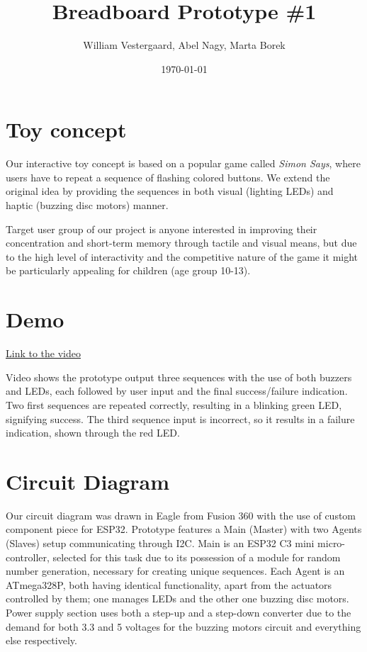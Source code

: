 \documentclass[a4paper]{article}
\title{Breadboard Prototype \#1}
\author{William Vestergaard, Abel Nagy, Marta Borek}
\date{\today}
\begin{document}
\maketitle	
\section{Toy concept}

\noindent Our interactive toy concept is based on a popular game called \textit{Simon Says}, where users have to repeat a sequence of flashing colored buttons. We extend the original idea by providing the sequences in both visual (lighting LEDs) and haptic (buzzing disc motors) manner.


\noindent Target user group of our project is anyone interested in improving their concentration and short-term memory through tactile and visual means, but due to the high level of interactivity and the competitive nature of the game it might be particularly appealing for children (age group 10-13).

\section{Demo}
\href{https://aarhusuniversitet-my.sharepoint.com/:v:/g/personal/au802349_uni_au_dk/EYu93GnpKyVOjn9N1xiUcd0BokxDAjE5eCbD5Ibb2XIgbQ?nav=eyJyZWZlcnJhbEluZm8iOnsicmVmZXJyYWxBcHAiOiJPbmVEcml2ZUZvckJ1c2luZXNzIiwicmVmZXJyYWxBcHBQbGF0Zm9ybSI6IldlYiIsInJlZmVycmFsTW9kZSI6InZpZXciLCJyZWZlcnJhbFZpZXciOiJNeUZpbGVzTGlua0NvcHkifX0&e=tQ1Llt}{Link to the video}

\noindent Video shows the prototype output three sequences with the use of both buzzers and LEDs, each followed by user input and the final success/failure indication. Two first sequences are repeated correctly, resulting in a blinking green LED, signifying success. The third sequence input is incorrect, so it results in a failure indication, shown through the red LED.

\section{Circuit Diagram}
Our circuit diagram was drawn in Eagle from Fusion 360 with the use of custom component piece for ESP32.
Prototype features a Main (Master) with two Agents (Slaves) setup communicating through I2C. Main is an ESP32 C3 mini micro-controller, selected for this task due to its possession of a module for random number generation, necessary for creating unique sequences.
Each Agent is an ATmega328P, both having identical functionality, apart from the actuators controlled by them; one manages LEDs and the other one buzzing disc motors.
Power supply section uses both a step-up and a step-down converter due to the demand for both 3.3 and 5 voltages for the buzzing motors circuit and everything else respectively.
\end{document}
